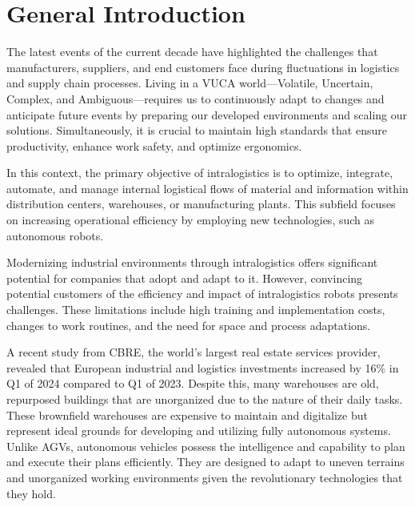 \chapter*{General Introduction}%
The latest events of the current decade have highlighted the challenges that manufacturers, suppliers, and end customers
face during fluctuations in logistics and supply chain processes. Living in a VUCA world—Volatile, Uncertain, Complex,
and Ambiguous—requires us to continuously adapt to changes and anticipate future events by preparing our developed
environments and scaling our solutions. Simultaneously, it is crucial to maintain high standards that ensure productivity,
enhance work safety, and optimize ergonomics. 


In this context, the primary objective of intralogistics is to optimize, integrate, automate, and manage internal 
logistical flows of material and information within distribution centers, warehouses, or manufacturing plants. 
This subfield focuses on increasing operational efficiency by employing new technologies, such as autonomous robots. 

Modernizing industrial environments through intralogistics offers significant potential for companies that adopt and adapt 
to it. However, convincing potential customers of the efficiency and impact of intralogistics robots presents challenges. 
These limitations include high training and implementation costs, changes to work routines, and the need for space and 
process adaptations. 


A recent study from CBRE, the world’s largest real estate services provider, revealed that European industrial and 
logistics investments increased by 16\% in Q1 of 2024 compared to Q1 of 2023. Despite this, many warehouses are old, 
repurposed buildings that are unorganized due to the nature of their daily tasks. These brownfield warehouses are 
expensive to maintain and digitalize but represent ideal grounds for developing and utilizing fully autonomous systems. 
Unlike AGVs, autonomous vehicles possess the intelligence and capability to plan and execute their plans efficiently. 
They are designed to adapt to uneven terrains and unorganized working environments given the revolutionary technologies 
that they hold. 

